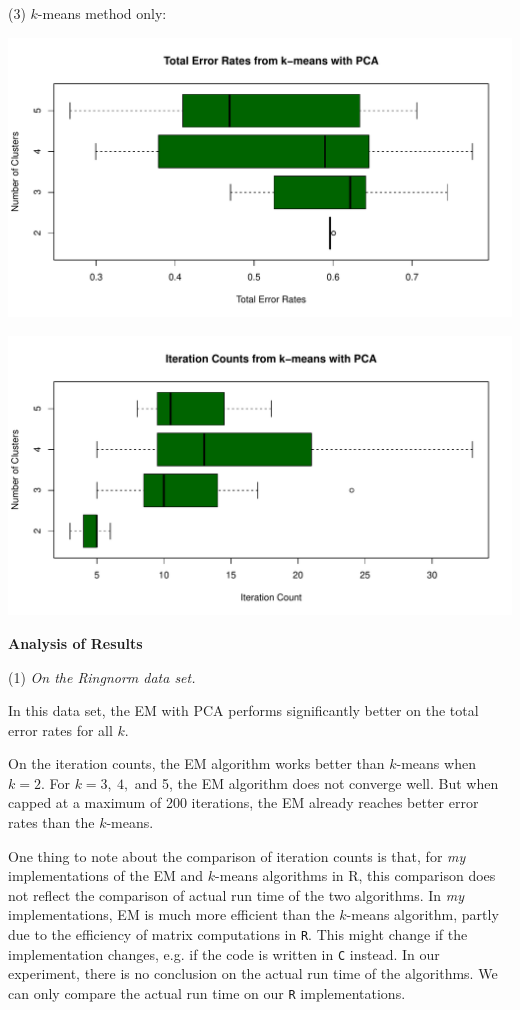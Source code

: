 \documentclass[a4paper,12pt]{article}
\newcommand{\code}[1]{\texttt{#1}}
\newcommand{\km}{$k$-means }
\begin{document}
\noindent (3) $k$-means method only:
\begin{center}
  \includegraphics[width=0.8\linewidth]{Image/Prob4-4-TotalErr-Ionosphere-kmeansPCA.pdf}
\end{center}
\begin{center}
  \includegraphics[width=0.8\linewidth]{Image/Prob4-4-ItrCount-Ionosphere-kmeansPCA.pdf}
\end{center}




\bigskip
\begin{center}
    \textcolor{mydarkgreen}{\textbf{Analysis of Results}}
\end{center}

\noindent 
(1) \emph{On the Ringnorm data set.}

In this data set, the EM with PCA performs significantly better on the total error rates for all $k$.

On the iteration counts, the EM algorithm works better than $k$-means when $k=2$. For $k=3,\ 4,$ and 5, the EM algorithm does not converge well. But when capped at a maximum of 200 iterations, the EM already reaches better error rates than the $k$-means.

One thing to note about the comparison of iteration counts is that, for \emph{my} implementations of the EM and $k$-means algorithms in R, this comparison does not reflect the comparison of actual run time of the two algorithms. In \emph{my} implementations, EM is much more efficient than the \km algorithm, partly due to the efficiency of matrix computations in \code{R}. This might change if the implementation changes, e.g. if the code is written in \code{C} instead. In our experiment, there is no conclusion on the actual run time of the algorithms. We can only compare the actual run time on our \code{R} implementations.
\bigskip\bigskip
\end{document}
